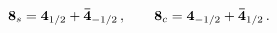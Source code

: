 \begin{equation}
{\bf 8}_s={\bf 4}_{1/2}+{\bf {\bar 4}}_{-1/2}\,,\qquad 
{\bf 8}_c={\bf 4}_{-1/2}+{\bf {\bar 4}}_{1/2}\,.
\end{equation}

